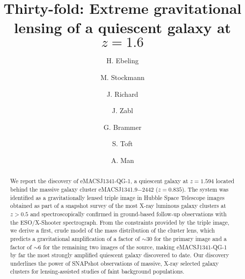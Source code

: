\documentclass[twocolumn,times]{aastex61}
\begin{document}
\title{Thirty-fold: Extreme gravitational lensing of a quiescent galaxy at $z=1.6$}


\author{H. Ebeling}

\author{M. Stockmann}

\author{J. Richard}

\author{J. Zabl}

\author{G. Brammer}

\author{S. Toft}

\author{A. Man}

\begin{abstract}
We report the discovery of eMACSJ1341-QG-1, a quiescent galaxy at $z=1.594$ located behind the massive galaxy cluster eMACSJ1341.9$-$2442 ($z=0.835$). The system was identified as a gravitationally lensed triple image in Hubble Space Telescope images obtained as part of a snapshot survey of the most X-ray luminous galaxy clusters at $z>0.5$ and spectroscopically confirmed in ground-based follow-up observations with the ESO/X-Shooter spectrograph. From the constraints provided by the triple image, we derive a first, crude model of the mass distribution of the cluster lens, which predicts a gravitational amplification of a factor of $\sim$30 for the primary image and a factor of $\sim$6 for the remaining two images of the source, making eMACSJ1341-QG-1 by far the most strongly amplified quiescent galaxy discovered to date. Our discovery underlines the power of SNAPshot observations of massive, X-ray selected galaxy clusters for lensing-assisted studies of faint background populations.
\end{abstract}
\end{document}
